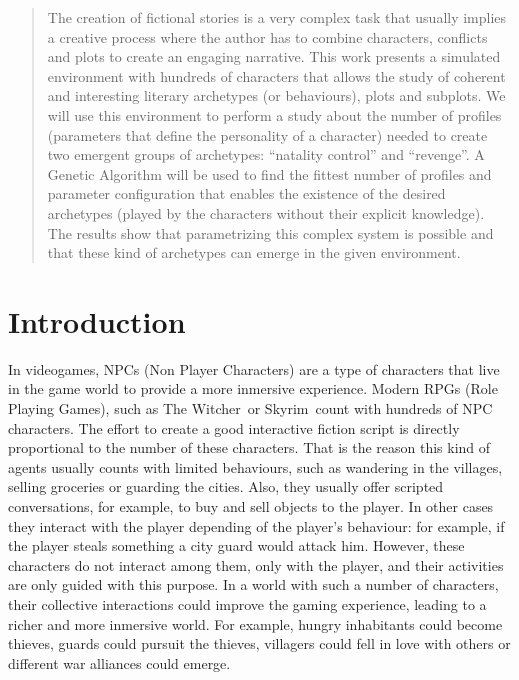 \documentclass[runningheads]{llncs}
\begin{document}
\begin{abstract}


The creation of fictional stories is a very complex task that usually
implies a creative process where the author has to combine characters,
conflicts and plots to create an engaging narrative. This work
presents a simulated environment with hundreds of characters that
allows the study of coherent and interesting literary archetypes (or
behaviours), plots and subplots. We will use this environment to
perform a study about the number of profiles (parameters that define
the personality of a character) needed to create two emergent groups
of archetypes: ``natality control'' and ``revenge''. A Genetic Algorithm
will be used to find the fittest number of profiles and parameter
configuration that enables the existence of the desired archetypes
(played by the characters without their explicit knowledge). The
results show that parametrizing this complex system is possible and
that these kind of archetypes can emerge in the given environment. 

\end{abstract}




\section{Introduction}
\noindent 

In videogames, NPCs (Non Player Characters)  are a type of characters that live in the game world to provide a more inmersive experience. Modern RPGs (Role Playing Games), such as The Witcher\texttrademark~or Skyrim\texttrademark~count with hundreds of NPC characters. The effort to create a good interactive fiction script is directly proportional to the number of these characters. That is the reason this kind of agents usually counts with limited behaviours, such as wandering in the villages, selling groceries or guarding the cities. Also, they usually offer scripted conversations, for example, to buy and sell objects to the player. In other cases they interact with the player depending of the player's behaviour: for example, if the player steals something a city guard would attack him.  However, these characters do not interact among them, only with the player, and their activities are only guided with this purpose. In a world with such a number of characters, their collective interactions could improve the gaming experience, leading to a richer and more inmersive world. For example, hungry inhabitants could become thieves, guards could pursuit the thieves, villagers could fell in love with others or different war alliances could emerge.
\end{document}
